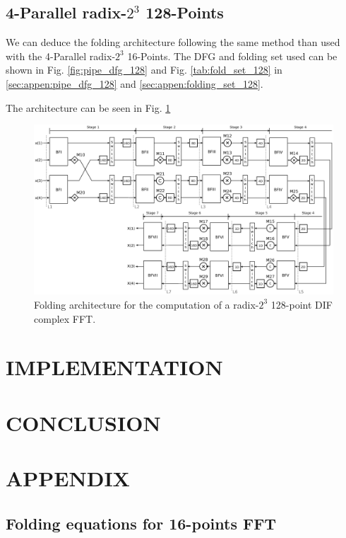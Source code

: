 \documentclass[journal,comsoc]{IEEEtran}
\begin{document}
\subsection{4-Parallel radix-$2^3$ 128-Points}
We can deduce the folding architecture following the same method than used with the 4-Parallel radix-$2^3$ 16-Points. The DFG and folding set used can be shown in Fig. \ref{fig:pipe_dfg_128} and Fig. \ref{tab:fold_set_128} in \ref{sec:appen:pipe_dfg_128} and \ref{sec:appen:folding_set_128}.

The architecture can be seen in Fig. \ref{fig:circ-folding-128}

\begin{figure}[htbp]%
\centering
 \includegraphics[width=0.95\linewidth]{Diagramas/folding-128.eps}%
\caption{Folding architecture for the computation of a radix-$2^3$ 128-point DIF complex FFT.}
\label{fig:circ-folding-128}
\end{figure}


\section{IMPLEMENTATION}
\section{CONCLUSION}
\section*{APPENDIX}
\subsection{Folding equations for 16-points FFT}
\end{document}
